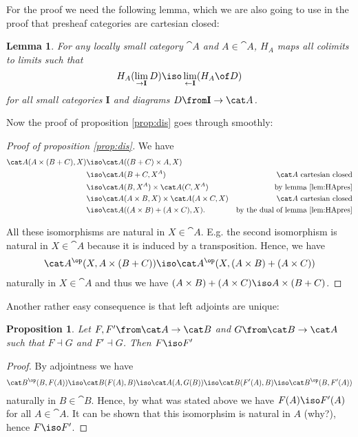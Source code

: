 \documentclass{article}
\newtheorem{lemma}{Lemma}
\newtheorem{proposition}{Proposition}
\begin{document}
For the proof we need the following lemma, which we are also going to use in the proof that presheaf categories are cartesian closed:
\begin{lemma}
  \label{lem:HApres}
  For any locally small category $\cat A$ and $A\in\cat A$, $H_A$ maps all colimits to limits such that $$H_A(\lim_{\to\mathbf I} D)\iso \lim_{\leftarrow\mathbf I}(H_A\of D)$$ for all small categories $\mathbf I$ and diagrams $D\from \mathbf I\to\cat A$.
\end{lemma}
Now the proof of proposition \ref{prop:dis} goes through smoothly:
\begin{proof}[Proof of proposition \ref{prop:dis}]
  We have 
  \begin{align*}
    \cat A(A\times (B+C),X)&\iso\cat A((B+C)\times A,X)\\
                           &\iso\cat A(B+C,X^A)&\cat A\text{ cartesian closed}\\
                           &\iso\cat A(B,X^A)\times \cat A(C,X^A) &\text{by lemma \ref{lem:HApres}}\\
                           &\iso\cat A(A\times B,X)\times \cat A(A\times C,X) &\cat A\text{ cartesian closed}\\
                           &\iso\cat A((A\times B)+(A\times C),X).&\text{by the dual of lemma \ref{lem:HApres}}
  \end{align*}
  
  All these isomorphisms are natural in $X\in\cat A$. E.g. the second isomorphism is natural in $X\in\cat A$ because it is induced by a transposition. Hence, we have 
  \begin{align*}
    \cat A^\op(X,A\times (B+C))\iso\cat A^\op(X,(A\times B)+(A\times C))
  \end{align*}
 naturally in $X\in\cat A$ and thus we have $(A\times B)+(A\times C)\iso A\times (B+C)$.
\end{proof}

Another rather easy consequence is that left adjoints are unique:

\begin{proposition}
  Let $F,F'\from \cat A\to\cat B$ and $G\from\cat B\to\cat A$ such that $F\dashv G$ and $F'\dashv G$. Then $F\iso F'$
\end{proposition}
\begin{proof}
  By adjointness we have 
  \begin{align*}
    \cat B^\op(B,F(A))\iso\cat B(F(A),B)\iso\cat A(A,G(B))\iso\cat B(F'(A),B)\iso\cat B^\op(B,F'(A))
  \end{align*}
  naturally in $B\in\cat B$. Hence, by what was stated above we have $F(A)\iso F'(A)$ for all $A\in\cat A$. It can be shown that this isomorphsim is natural in $A$ (why?), hence $F\iso F'$.
\end{proof}
\end{document}

